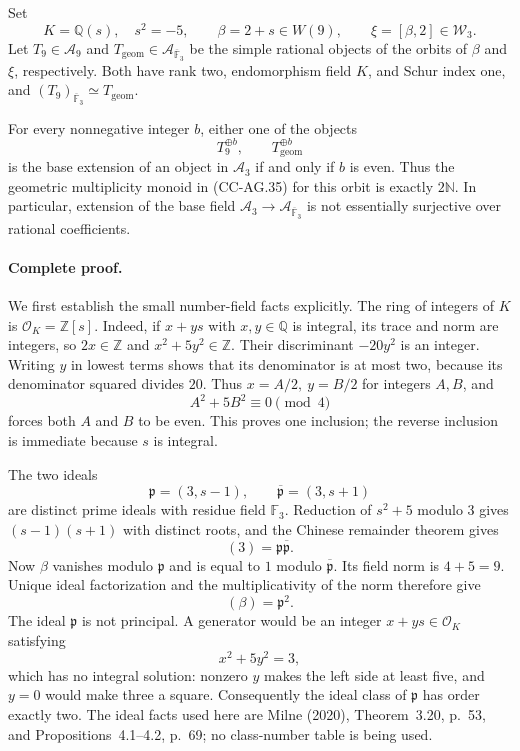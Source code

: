 Set
\[
 K=\mathbb Q(s),\quad s^2=-5,\qquad
 \beta=2+s\in W(9),\qquad
 \xi=[\beta,2]\in\mathcal W_3.
                                                               \tag{CC-AG.42}
\]
Let \(T_9\in\mathcal A_9\) and
\(T_{\mathrm{geom}}\in\mathcal A_{\overline{\mathbb F}_3}\)
be the simple rational objects of the orbits of
\(\beta\) and \(\xi\), respectively.  Both have rank two,
endomorphism field \(K\), and Schur index one, and
\((T_9)_{\overline{\mathbb F}_3}\simeq T_{\mathrm{geom}}\).

For every nonnegative integer \(b\), either one of the
objects
\[
                T_9^{\oplus b},\qquad
                T_{\mathrm{geom}}^{\oplus b}
\]
is the base extension of an object in \(\mathcal A_3\)
if and only if \(b\) is even.
Thus the geometric multiplicity monoid in (CC-AG.35)
for this orbit is exactly \(2\mathbb N\).  In particular,
extension of the base field
\(\mathcal A_3\to\mathcal A_{\overline{\mathbb F}_3}\)
is not essentially surjective over rational coefficients.

\paragraph{Complete proof.}
We first establish the small number-field facts explicitly.
The ring of integers of \(K\) is
\(\mathcal O_K=\mathbb Z[s]\).  Indeed, if \(x+ys\)
with \(x,y\in\mathbb Q\) is integral, its trace and norm
are integers, so \(2x\in\mathbb Z\) and
\(x^2+5y^2\in\mathbb Z\).  Their discriminant
\(-20y^2\) is an integer.  Writing \(y\) in lowest
terms shows that its denominator is at most two, because
its denominator squared divides \(20\).
Thus \(x=A/2,\ y=B/2\) for integers \(A,B\), and
\[
                         A^2+5B^2\equiv0\pmod4
\]
forces both \(A\) and \(B\) to be even.  This proves one
inclusion; the reverse inclusion is immediate because
\(s\) is integral.

The two ideals
\[
       \mathfrak p=(3,s-1),\qquad
       \overline{\mathfrak p}=(3,s+1)
\]
are distinct prime ideals with residue field \(\mathbb F_3\).
Reduction of \(s^2+5\) modulo \(3\) gives
\((s-1)(s+1)\) with distinct roots, and the Chinese
remainder theorem gives
\[
                     (3)=\mathfrak p\overline{\mathfrak p}.
\]
Now \(\beta\) vanishes modulo \(\mathfrak p\) and is
equal to \(1\) modulo \(\overline{\mathfrak p}\).
Its field norm is \(4+5=9\).
Unique ideal factorization and the multiplicativity of
the norm therefore give
\[
                           (\beta)=\mathfrak p^2.             \tag{CC-AG.43}
\]
The ideal \(\mathfrak p\) is not principal.  A generator
would be an integer \(x+ys\in\mathcal O_K\) satisfying
\[
                           x^2+5y^2=3,
\]
which has no integral solution: nonzero \(y\) makes the
left side at least five, and \(y=0\) would make three
a square.  Consequently the ideal class of
\(\mathfrak p\) has order exactly two.  The ideal facts
used here are Milne (2020), Theorem~3.20, p.~53, and
Propositions~4.1--4.2, p.~69; no class-number table is
being used.

